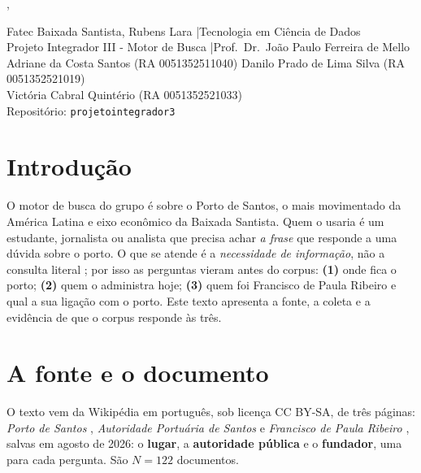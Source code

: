 \documentclass[
  article,
  12pt,
  oneside,
  a4paper,
  english,
  brazil
]{abntex2}\usepackage[]{graphicx}\usepackage[]{xcolor}
\newcommand{\nomecurso}{Tecnologia em Ciência de Dados}
\newcommand{\nomedisciplina}{Projeto Integrador III - Motor de Busca}
\newcommand{\nomeprofessor}{Prof.\ Dr.\ João Paulo Ferreira de Mello}
\newcommand{\repositorio}{projetointegrador3}
\newcommand{\integrantes}{%
  Adriane da Costa Santos (RA 0051352511040) \quad
  Danilo Prado de Lima Silva (RA 0051352521019) \\
  Victória Cabral Quintério (RA 0051352521033)%
}
\begin{document}
\frenchspacing
\captiondelim{ - }

\begin{center}
  \SingleSpacing
  {\Large \imprimirtitulo \par}
  \vspace{0.8em}
  {\large \imprimirautor \par}
  \vspace{0.3em}
  \imprimirlocal, \imprimirdata
\end{center}

\begin{center}
  \small
  \SingleSpacing
  Fatec Baixada Santista, Rubens Lara \quad|\quad \nomecurso{} \\
  \nomedisciplina{} \quad|\quad \nomeprofessor{} \\[0.3em]
  {\footnotesize \integrantes} \\[0.3em]
  Repositório: \texttt{\repositorio}
\end{center}

\textual

\section{Introdução}

O motor de busca do grupo é sobre o Porto de Santos, o mais movimentado da
América Latina e eixo econômico da Baixada Santista. Quem o usaria é um
estudante, jornalista ou analista que precisa achar \emph{a frase} que responde
a uma dúvida sobre o porto. O que se atende é a \emph{necessidade de
informação}, não a consulta literal \cite[cap.~1]{manning2008}; por isso as
perguntas vieram antes do corpus: \textbf{(1)} onde fica o porto; \textbf{(2)}
quem o administra hoje; \textbf{(3)} quem foi Francisco de Paula Ribeiro e
qual a sua ligação com o porto. Este texto apresenta a fonte, a coleta e a
evidência de que o corpus responde às três.

\section{A fonte e o documento}

O texto vem da Wikipédia em português, sob licença CC BY-SA, de três páginas:
\textit{Porto de Santos} \cite{wikiporto}, \textit{Autoridade Portuária de
Santos} \cite{wikiaps} e \textit{Francisco de Paula Ribeiro}
\cite{wikiribeiro}, salvas em agosto de 2026: o \textbf{lugar}, a
\textbf{autoridade pública} e o \textbf{fundador}, uma para cada pergunta.
São $N = \text{122}$ documentos.
\end{document}

